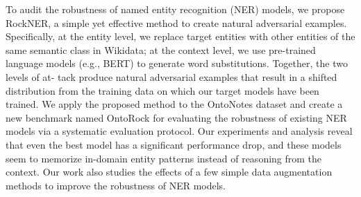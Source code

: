 To audit the robustness of named entity recognition (NER) models, we propose RockNER, a simple yet effective method to create natural adversarial examples. Specifically, at the entity level, we replace target entities with other entities of the same semantic class in Wikidata; at the context level, we use pre-trained language models (e.g., BERT) to generate word substitutions. Together, the two levels of at- tack produce natural adversarial examples that result in a shifted distribution from the training data on which our target models have been trained. We apply the proposed method to the OntoNotes dataset and create a new benchmark named OntoRock for evaluating the robustness of existing NER models via a systematic evaluation protocol. Our experiments and analysis reveal that even the best model has a significant performance drop, and these models seem to memorize in-domain entity patterns instead of reasoning from the context. Our work also studies the effects of a few simple data augmentation methods to improve the robustness of NER models.
